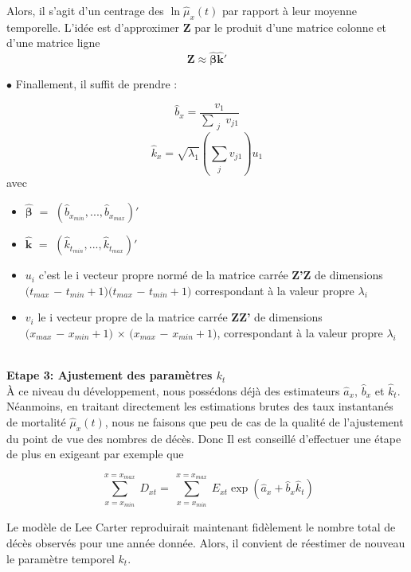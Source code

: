 \documentclass[french]{report}
\begin{document}
Alors, il s’agit d’un centrage des $\ln\hat\mu_{x}(t)$ par rapport à leur moyenne temporelle.
L’idée est d’approximer \textbf{Z} par le produit d’une matrice colonne et d’une
matrice ligne
\[  \textbf{Z} \approx \bm{\hat\beta} \bm{\hat k'} \] 

\newline$\bullet$ Finallement, il suffit de prendre :


\[\hat{b}_{x} = \frac{{v}_{1}}{\sum\limits_{\substack{j}}{v}_{j1}}\]
\[\hat{k}_{x} = \sqrt{\lambda_{1}}(\sum\limits_{\substack{j}}{v}_{j1}) {u}_{1}\]
avec \begin{itemize}
 
    \item $\bm{\hat\beta}$ $=$ $(\hat{b}_{{x}_{min}},...,\hat{b}_{{x}_{max}})'$
    \item $\bm{\hat k}$  $=$ $(\hat{k}_{{t}_{min}},...,\hat{k}_{{t}_{max}})'$
    \item $u_{i}$ c'est le i vecteur propre normé de la matrice carrée \textbf{Z'Z} de dimensions \\ $({t}_{max}$ $-$ ${t}_{min}+1)$\times$({t}_{max}$ $-$ ${t}_{min}+1)$ correspondant à la valeur propre $\lambda_{i}$  
    \item ${v}_{i}$ le i vecteur propre de la matrice carrée \textbf{ZZ'} de dimensions \\$({x}_{max}$ $-$ ${x}_{min}+1)$ $\times$ $({x}_{max}$ $-$ ${x}_{min}+1)$, correspondant à la valeur propre $\lambda_{i}$
\end{itemize} 



\newline
\\
\textbf{Etape 3: Ajustement des paramètres $k_{t}$} 
\newline
\\
À ce niveau du développement, nous possédons déjà des estimateurs $\hat{a}_{x}$, ${\hat{b}}_{x}$ et $\hat{k}_{t}$. Néanmoins, en traitant directement les estimations brutes des taux
instantanés de mortalité  $\hat\mu_{x}(t)$, nous ne faisons que peu de cas de la qualité
de l’ajustement du point de vue des nombres de décès. Donc Il est conseillé
d’effectuer une étape de plus en exigeant par exemple que

\[\sum\limits_{\substack{x=x_{min}}}^{x=x_{max}} D_{xt} = \sum\limits_{\substack{x=x_{min}}}^{x=x_{max}} E_{xt} \exp(\hat{a}_{x} +\hat{b}_{x} \hat{k}_{t})\]

Le modèle de Lee Carter reproduirait maintenant fidèlement le nombre total de décès observés pour une année donnée. Alors, il convient de réestimer de nouveau le paramètre temporel ${k}_{t}$.
\end{document}

